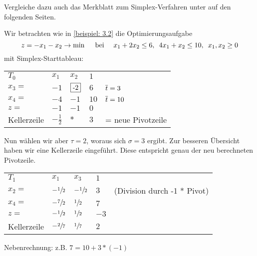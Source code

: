 Vergleiche dazu auch das Merkblatt zum Simplex-Verfahren unter auf den folgenden Seiten. 



\begin{beispiel} %
	Wir betrachten wie in \cref{beispiel: 3.2} die Optimierungsaufgabe
	\begin{equation*}
	z = -x_1 - x_2 \to \min \quad \text{ bei } \quad x_1 + 2 x_2 \le 6, \enskip 4x_1 + x_2 \le 10, \enskip x_1, x_2 \ge 0
	\end{equation*} 
	mit Simplex-Starttableau:
	\begin{indentpar}
		\begin{tabular}{R{1.8cm}|R{0.6cm}R{0.6cm}|R{0.6cm} l}
			$T_0$ & $x_1$ & $x_2$ & $1$ \\ 
			$x_3 = $ & $-1$ & $\fbox{-2}$ & $6$ & {\footnotesize $\overline{t} = 3$} \\ 
			$x_4 = $ & $-4$ & $-1$ & $10$ & {\footnotesize $\overline{t} = 10$} \\ 
			$z =$ & $-1$ & $-1$    & $0$ \\ 
			Kellerzeile & $-\frac{1}{2}$ & $\ast$ & $3$ & {\footnotesize = neue Pivotzeile}
		\end{tabular}
	\end{indentpar}
	Nun wählen wir aber $\tau = 2$, woraus sich $\sigma =  3$ ergibt.
	Zur besseren Übersicht haben wir eine Kellerzeile eingeführt. Diese entspricht genau der neu berechneten Pivotzeile.
	\begin{indentpar}
		\begin{tabular}{R{1.8cm}|R{0.6cm}R{0.6cm}|R{0.6cm} l}
			$T_1$ & $x_1$ & \textcolor{cdpurple}{$x_3$} & $1$ \\ \cline{1-4}
			\textcolor{cdpurple}{$x_2 = $} & $- \sfrac{1}{2}$ & $-\sfrac{1}{2}$ & $3$ & {\footnotesize (Division durch -1 * Pivot)} \\ 
			$x_4 = $ & $-\sfrac{7}{2}$ & $\sfrac{1}{2}$ & $7$ \\ \cline{1-4}
			$z =$ & $-\sfrac{1}{2}$ & $\sfrac{1}{2}$  & $-3$ \\ \cline{1-4}
			Kellerzeile & $-\sfrac{2}{7}$ & $\sfrac{1}{7}$ & $2$
		\end{tabular}
	\end{indentpar}
	Nebenrechnung: z.B. $ 7 = 10 + 3 * (-1)$
	

\end{beispiel}
